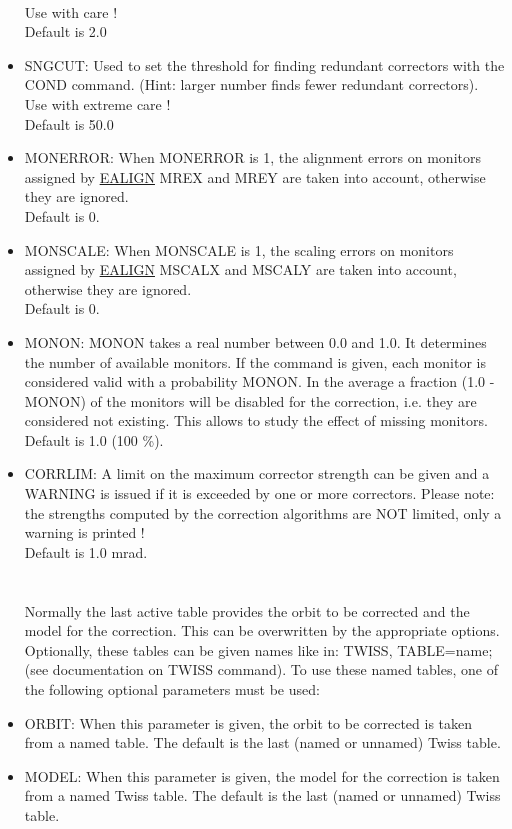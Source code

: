 \begin{itemize}
\\ Use with care ! 
\\ Default is 2.0 
	\item SNGCUT:  Used to set the threshold for finding redundant correctors with the COND command. (Hint: larger number finds fewer redundant correctors). 
\\ Use with extreme care ! 
\\ Default is 50.0 
	\item MONERROR: When MONERROR is 1, the alignment errors on monitors assigned  by \href{../error/error_align.html}{EALIGN} MREX and MREY are taken into account, otherwise they are ignored. 
\\ Default is 0. 
	\item MONSCALE: When MONSCALE is 1, the scaling errors on monitors assigned  by \href{../error/error_align.html}{EALIGN} MSCALX and MSCALY are taken into account, otherwise they are ignored. 
\\ Default is 0. 
	\item MONON: MONON takes a real number between 0.0 and 1.0. It determines the number of available monitors. If the command is given, each monitor is considered valid with a probability MONON. In the average a fraction (1.0 - MONON) of the monitors will be disabled for the correction, i.e. they are considered  not existing.  This allows to study the effect of missing monitors. 
\\ Default is 1.0 (100 \%). 
	\item CORRLIM:  A limit on the maximum corrector strength can be given and a WARNING is issued if it is exceeded by one or more correctors.  Please note: the strengths computed by the correction algorithms are NOT limited, only a warning is printed ! 
\\ Default is 1.0 mrad. 
\\
\\
\\ Normally the last active table provides the orbit to be  corrected and the model for the correction. This can be overwritten by the appropriate options. Optionally, these tables can be given names like in:  TWISS, TABLE=name; (see documentation on TWISS command). To use these named tables, one of the following optional parameters must be  used: 
	\item ORBIT: When this parameter is given, the orbit to be corrected is taken from a named table. The default is the last (named or unnamed) Twiss table. 
	\item MODEL: When this parameter is given, the model for the correction is taken from a named Twiss table. The default is the last (named or unnamed) Twiss table. 

\end{itemize}
